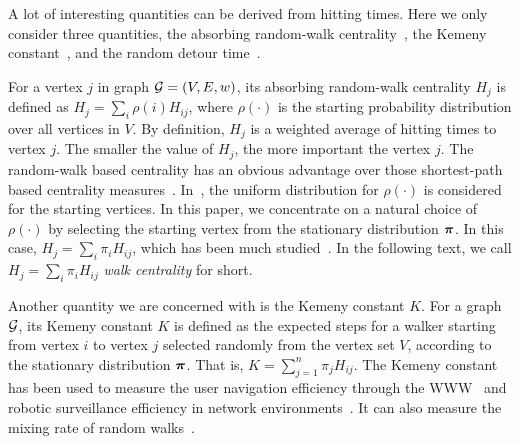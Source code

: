 \documentclass[10pt,twocolumn,twoside]{IEEEtran}
\begin{document}
A lot of interesting quantities can be derived from hitting times. Here we only consider three quantities, the absorbing random-walk centrality~\cite{WhSm03,MaMaGi15}, the Kemeny constant~\cite{Hu14}, and the random detour time~\cite{BoRaZh11,RaZh13}.

For a vertex \(j\) in graph \(\mathcal{G}=(V,E,w)\), its absorbing random-walk centrality \(H_j\) is defined as \(H_j=\sum_{i} \rho(i) H_{ij}\), where \(\rho(\cdot)\) is the starting probability distribution over all vertices in \(V\). By definition, \(H_j\) is a weighted average of hitting times to vertex \(j\). The smaller the value of \(H_j\), the more important the vertex \(j\). The random-walk based centrality has an obvious advantage over those shortest-path based centrality measures~\cite{Ne05}. In~\cite{WhSm03,MaMaGi15}, the uniform distribution for \(\rho(\cdot)\) is considered for the starting  vertices. In this paper, we concentrate on a natural choice of  \(\rho(\cdot)\) by selecting the starting vertex from the stationary distribution \(\boldsymbol{\pi}\). In this case, \(H_j=\sum_{i} \pi_i H_{ij}\), which has been much studied~\cite{TeBeVo09,Be09,Be16}. In the following text, we  call \(H_j=\sum_{i} \pi_i H_{ij}\) \textit{walk centrality} for short.

Another quantity we are concerned with is the Kemeny constant \(K\). For a graph \(\mathcal{G}\), its Kemeny constant \(K\) is defined as the expected steps for a walker starting from  vertex \(i\) to vertex \(j\) selected randomly from the vertex set \(V\), according to the stationary distribution \(\boldsymbol{\pi}\). That is, \(K = \sum_{j = 1}^{n} \pi_j H_{ij}\). The Kemeny constant has been used to measure the user navigation efficiency through the WWW~\cite{LeLo02} and  robotic surveillance efficiency in network environments~\cite{PaAgBu15}. It can also measure the mixing rate of random walks~\cite{LePeWi09}.

\end{document}
